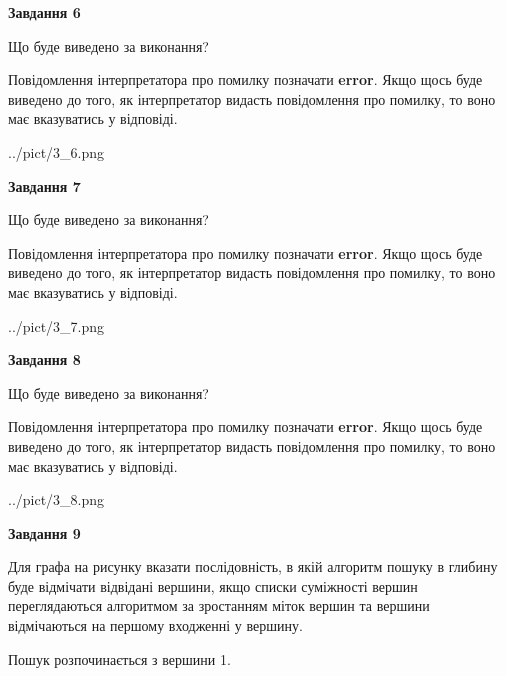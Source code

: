 \documentclass[12pt, ukrainian]{article}
\begin{document}
{\begin {large}
{\begin {center}\textbf{Завдання 6}\end {center}}\par
Що буде виведено за виконання?

Повідомлення інтерпретатора про помилку позначати \textbf{error}.
Якщо щось буде виведено до того, як інтерпретатор видасть повідомлення про помилку, 
то воно має вказуватись у відповіді. \par


\begin{center}
	{../pict/3_6.png}
\end{center}
\newpage

{\begin {center}\textbf{Завдання 7}\end {center}}\par
Що буде виведено за виконання?

Повідомлення інтерпретатора про помилку позначати \textbf{error}.
Якщо щось буде виведено до того, як інтерпретатор видасть повідомлення про помилку, 
то воно має вказуватись у відповіді. \par


\begin{center}
	{../pict/3_7.png}
\end{center}
\newpage

{\begin {center}\textbf{Завдання 8}\end {center}}\par
Що буде виведено за виконання?

Повідомлення інтерпретатора про помилку позначати \textbf{error}.
Якщо щось буде виведено до того, як інтерпретатор видасть повідомлення про помилку, 
то воно має вказуватись у відповіді. \par


\begin{center}
	{../pict/3_8.png}
\end{center}
\newpage

{\begin {center}\textbf{Завдання 9}\end {center}}\par
Для графа на рисунку вказати послідовність, в якій алгоритм пошуку в глибину буде відмічати відвідані вершини, якщо списки суміжності вершин переглядаються алгоритмом за зростанням міток вершин та вершини відмічаються на першому вход\-женні у вершину.\par
Пошук розпочинається з вершини 1.\par


\end{large}}
\end{document}

